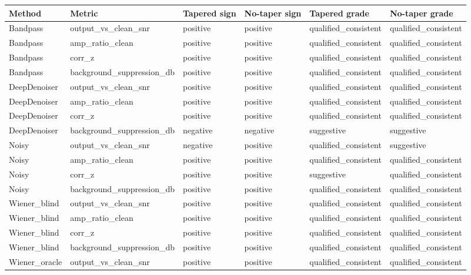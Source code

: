 \begin{tabular}{llllll}
\toprule
Method & Metric & Tapered sign & No-taper sign & Tapered grade & No-taper grade \\
\midrule
Bandpass & output\_vs\_clean\_snr & positive & positive & qualified\_consistent & qualified\_consistent \\
Bandpass & amp\_ratio\_clean & positive & positive & qualified\_consistent & qualified\_consistent \\
Bandpass & corr\_z & positive & positive & qualified\_consistent & qualified\_consistent \\
Bandpass & background\_suppression\_db & positive & positive & qualified\_consistent & qualified\_consistent \\
DeepDenoiser & output\_vs\_clean\_snr & positive & positive & qualified\_consistent & qualified\_consistent \\
DeepDenoiser & amp\_ratio\_clean & positive & positive & qualified\_consistent & qualified\_consistent \\
DeepDenoiser & corr\_z & positive & positive & qualified\_consistent & qualified\_consistent \\
DeepDenoiser & background\_suppression\_db & negative & negative & suggestive & suggestive \\
Noisy & output\_vs\_clean\_snr & negative & positive & qualified\_consistent & suggestive \\
Noisy & amp\_ratio\_clean & positive & positive & qualified\_consistent & qualified\_consistent \\
Noisy & corr\_z & positive & positive & suggestive & qualified\_consistent \\
Noisy & background\_suppression\_db & positive & positive & qualified\_consistent & qualified\_consistent \\
Wiener\_blind & output\_vs\_clean\_snr & positive & positive & qualified\_consistent & qualified\_consistent \\
Wiener\_blind & amp\_ratio\_clean & positive & positive & qualified\_consistent & qualified\_consistent \\
Wiener\_blind & corr\_z & positive & positive & qualified\_consistent & qualified\_consistent \\
Wiener\_blind & background\_suppression\_db & positive & positive & qualified\_consistent & qualified\_consistent \\
Wiener\_oracle & output\_vs\_clean\_snr & positive & positive & qualified\_consistent & qualified\_consistent \\

\end{tabular}
